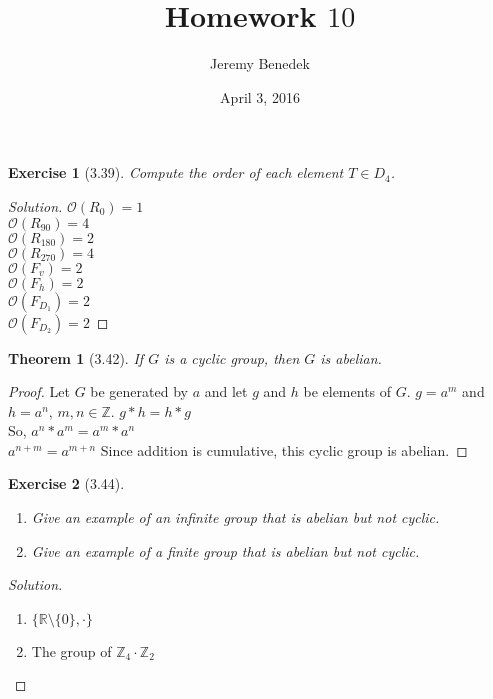 \documentclass{article}
\title{Homework $10$}
\author{Jeremy Benedek}
\date{April 3, 2016}
\newtheorem*{thm}{Theorem}
\newtheorem*{ex}{Exercise}
\newenvironment{solution}
  {\begin{proof}[Solution]}
  {\renewcommand{\qedsymbol}{}\end{proof}}
\begin{document}
\maketitle

\begin{ex}[3.39]
	Compute the order of each element $T\in D_4$.
\end{ex}
\begin{solution}
	$\mathcal{O}(R_0) = 1$ \\
	$\mathcal{O}(R_{90}) = 4$ \\ 
	$\mathcal{O}(R_{180}) = 2$ \\
	$\mathcal{O}(R_{270}) = 4$ \\
	$\mathcal{O}(F_v) = 2$ \\ 
	$\mathcal{O}(F_h) = 2$ \\
	$\mathcal{O}(F_{D_1}) = 2$ \\
	$\mathcal{O}(F_{D_2}) = 2$
\end{solution}

\begin{thm}[3.42]
	If $G$ is a cyclic group, then $G$ is abelian.
\end{thm}
\begin{proof}
	Let $G$ be generated by $a$ and let $g$ and $h$ be elements of $G$. $g=a^m$ and $h=a^n$, $m,n \in \mathbb{Z}$. 
	$g*h = h*g$ \\ So, $a^n * a^m = a^m * a^n$ \\ $a^{n+m} = a^{m+n}$ Since addition is cumulative, this cyclic group is abelian. 
\end{proof}

\begin{ex}[3.44]
	\begin{enumerate}
	  \item Give an example of an infinite group that is abelian but not cyclic.
	  \item Give an example of a finite group that is abelian but not cyclic.
	\end{enumerate}
\end{ex}
\begin{solution}
	\begin{enumerate}
	  \item $\{\mathbb{R}\setminus \{0\}, \cdot\}$
      \item The group of $\mathbb{Z}_4 \cdot \mathbb{Z}_2$
	\end{enumerate}

\end{solution}
\end{document}
